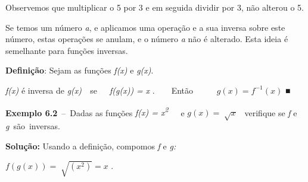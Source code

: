 \documentclass[12pt]{article}
\begin{document}
\begin{enumerate}[label*={\fontsize{14pt}{14pt}\selectfont \textbf{\arabic*.}}]
\begin{adjustwidth}{0.98in}{0.0in}
Observemos que multiplicar o 5 por 3 e em seguida dividir por 3, não alterou o 5.\par

\end{adjustwidth}

Se temos um número \textit{a}, e aplicamos uma operação e a sua inversa sobre este número, estas operações se anulam, e o número \textit{a} não é alterado. Esta ideia é semelhante para funções inversas.\par


\vspace{\baselineskip}
\par 
\begin{justify}
\textbf{Definição}: Sejam as funções \textit{f(x)} e \textit{g(x)}. 
\end{justify}\par

\begin{justify}
\textit{f(x)} é inversa de \textit{g(x)\ \  }se\ \ \  \textit{f(g(x))} \textit{= x }.\ \ \ \  Então\ \ \ \ \  \textit{  \( g \left( x \right) =f^{-1} \left( x \right)  \) }■
\end{justify}\par


\vspace{\baselineskip}

\vspace{\baselineskip}
\begin{justify}
\textbf{Exemplo 6.2}\ –\ Dadas as funções   \textit{f(x) = x\textsuperscript{2}}\ \ \ e   \( g \left( x \right) =\sqrt[]{x} \) \  verifique se \textit{f} e \textit{g}\ são\ inversas.   
\end{justify}\par

\begin{justify}
\textbf{Solução:  }Usando a definição, compomos\textbf{ }\textit{f} e \textit{g:}
\end{justify}\par

\begin{justify}
 \( f \left( g \left( x \right)  \right) =\sqrt[]{ \left( x^{2} \right) }=x \) . 
\end{justify}\par


\end{enumerate}
\end{document}

